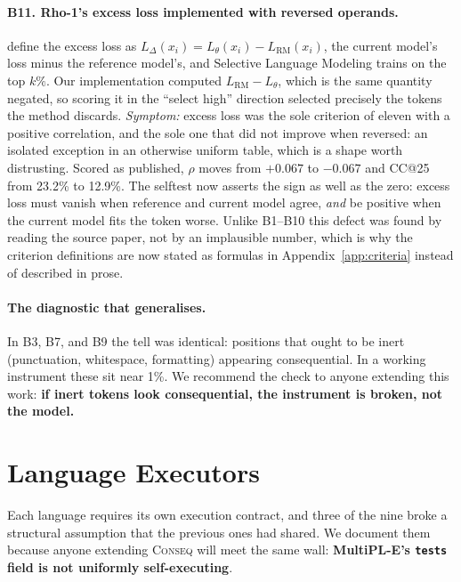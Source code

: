 \paragraph{B11. Rho-1's excess loss implemented with reversed operands.} \citet{lin2024rho}
define the excess loss as $L_\Delta(x_i) = L_\theta(x_i) - L_{\mathrm{RM}}(x_i)$, the current
model's loss minus the reference model's, and Selective Language Modeling trains on the top $k\%$.
Our implementation computed $L_{\mathrm{RM}} - L_\theta$, which is the same quantity negated, so
scoring it in the ``select high'' direction selected precisely the tokens the method discards.
\emph{Symptom:} excess loss was the sole criterion of eleven with a positive correlation, and the
sole one that did not improve when reversed: an isolated exception in an otherwise uniform table,
which is a shape worth distrusting. Scored as published, $\rho$ moves from $+0.067$ to $-0.067$ and
CC@25 from 23.2\% to 12.9\%. The selftest now asserts the sign as well as the zero: excess loss must
vanish when reference and current model agree, \emph{and} be positive when the current model fits
the token worse. Unlike B1--B10 this defect was found by reading the source paper, not by an
implausible number, which is why the criterion definitions are now stated as formulas in
Appendix~\ref{app:criteria} instead of described in prose.

\paragraph{The diagnostic that generalises.} In B3, B7, and B9 the tell was identical: positions that
ought to be inert (punctuation, whitespace, formatting) appearing consequential. In a working
instrument these sit near 1\%. We recommend the check to anyone extending this work: \textbf{if
inert tokens look consequential, the instrument is broken, not the model.}

\section{Language Executors}
\label{app:executors}
\label{app:executors}

Each language requires its own execution contract, and three of the nine broke a structural
assumption that the previous ones had shared. We document them because anyone extending
\textsc{Conseq} will meet the same wall: \textbf{MultiPL-E's \texttt{tests} field is not uniformly
self-executing}.

